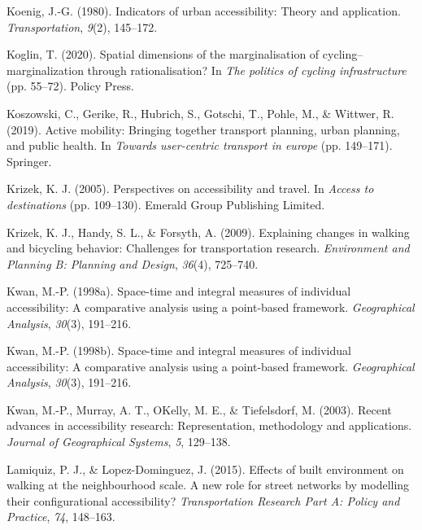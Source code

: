 \documentclass[
11pt, %
oneside, %
english, %
singlespacing, %
]{macthesis} %
\newlength{\cslhangindent}
\newenvironment{CSLReferences}[2] %
 {%
  \setlength{\parindent}{0pt}
  \ifodd #1 \everypar{\setlength{\hangindent}{\cslhangindent}}\ignorespaces\fi
  \ifnum #2 > 0
  \setlength{\parskip}{#2\baselineskip}
  \fi
 }%
 {}
\begin{document}
\begin{CSLReferences}{1}{0}
\leavevmode{}%
Koenig, J.-G. (1980). Indicators of urban accessibility: Theory and application. \emph{Transportation}, \emph{9}(2), 145--172.

\leavevmode{}%
Koglin, T. (2020). Spatial dimensions of the marginalisation of cycling--marginalization through rationalisation? In \emph{The politics of cycling infrastructure} (pp. 55--72). Policy Press.

\leavevmode{}%
Koszowski, C., Gerike, R., Hubrich, S., Gotschi, T., Pohle, M., \& Wittwer, R. (2019). Active mobility: Bringing together transport planning, urban planning, and public health. In \emph{Towards user-centric transport in europe} (pp. 149--171). Springer.

\leavevmode{}%
Krizek, K. J. (2005). Perspectives on accessibility and travel. In \emph{Access to destinations} (pp. 109--130). Emerald Group Publishing Limited.

\leavevmode{}%
Krizek, K. J., Handy, S. L., \& Forsyth, A. (2009). Explaining changes in walking and bicycling behavior: Challenges for transportation research. \emph{Environment and Planning B: Planning and Design}, \emph{36}(4), 725--740.

\leavevmode{}%
Kwan, M.-P. (1998a). Space-time and integral measures of individual accessibility: A comparative analysis using a point-based framework. \emph{Geographical Analysis}, \emph{30}(3), 191--216.

\leavevmode{}%
Kwan, M.-P. (1998b). Space-time and integral measures of individual accessibility: A comparative analysis using a point-based framework. \emph{Geographical Analysis}, \emph{30}(3), 191--216.

\leavevmode{}%
Kwan, M.-P., Murray, A. T., OKelly, M. E., \& Tiefelsdorf, M. (2003). Recent advances in accessibility research: Representation, methodology and applications. \emph{Journal of Geographical Systems}, \emph{5}, 129--138.

\leavevmode{}%
Lamiquiz, P. J., \& Lopez-Dominguez, J. (2015). Effects of built environment on walking at the neighbourhood scale. A new role for street networks by modelling their configurational accessibility? \emph{Transportation Research Part A: Policy and Practice}, \emph{74}, 148--163.


\end{CSLReferences}
\end{document}
